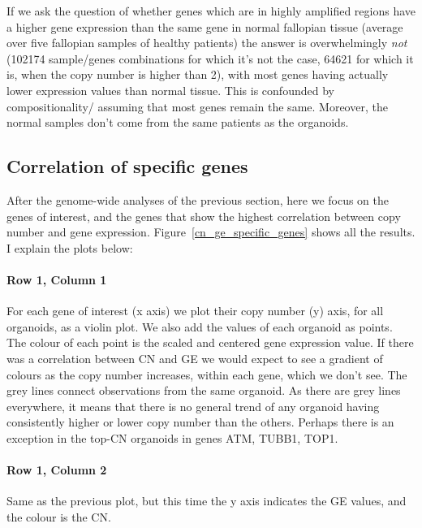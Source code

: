 \documentclass{article}
\begin{document}
\medskip

If we ask the question of whether genes which are in highly amplified regions have a higher gene expression than the same gene in normal fallopian tissue (average over five fallopian samples of healthy patients) the answer is overwhelmingly \emph{not} (102174 sample/genes combinations for which it's not the case,  64621 for which it is, when the copy number is higher than 2), with most genes having actually lower expression values than normal tissue. This is confounded by compositionality/ assuming that most genes remain the same. Moreover, the normal samples don't come from the same patients as the organoids.

\clearpage
\subsection{Correlation of specific genes}
After the genome-wide analyses of the previous section, here we focus on the genes of interest, and the genes that show the highest correlation between copy number and gene expression. Figure~\ref{cn_ge_specific_genes} shows all the results. I explain the plots below:

\paragraph{Row 1, Column 1} For each gene of interest (x axis) we plot their copy number (y) axis, for all organoids, as a violin plot. We also add the values of each organoid as points. The colour of each point is the scaled and centered gene expression value. If there was a correlation between CN and GE we would expect to see a gradient of colours as the copy number increases, within each gene, which we don't see. The grey lines connect observations from the same organoid. As there are grey lines everywhere, it means that there is no general trend of any organoid having consistently higher or lower copy number than the others. Perhaps there is an exception in the top-CN organoids in genes ATM, TUBB1, TOP1.

\paragraph{Row 1, Column 2} Same as the previous plot, but this time the y axis indicates the GE values, and the colour is the CN.
\end{document}
